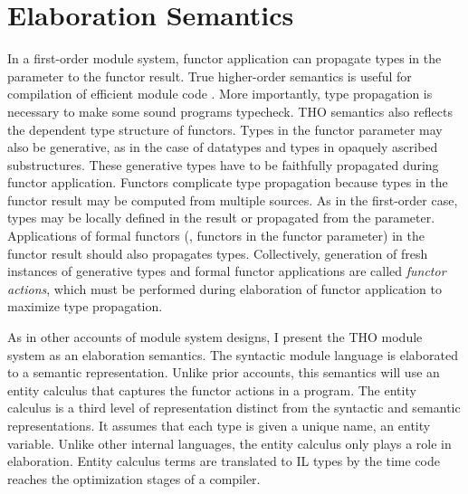   

\chapter{Elaboration Semantics}\label{ch:homods}
 
In a first-order module system, functor application can propagate types in the parameter to the functor result. True higher-order semantics is useful for compilation of efficient module code \cite{shao98}. More importantly, type propagation is necessary to make some sound programs typecheck. THO semantics also reflects the dependent type structure of functors. Types in the functor parameter may also be generative, as in the case of datatypes and types in opaquely ascribed substructures. These generative types have to be faithfully propagated during functor application. Functors complicate type propagation because types in the functor result may be computed from multiple sources. As in the first-order case, types may be locally defined in the result or propagated from the parameter. Applications of formal functors (\ie, functors in the functor parameter) in the functor result should also propagates types. Collectively, generation of fresh instances of generative types and formal functor applications are called \emph{functor actions}, which must be performed during elaboration of functor application to maximize type propagation.    
 
As in other accounts of module system designs, I present the THO module system as an elaboration semantics. The syntactic module language is elaborated to a semantic representation. Unlike prior accounts, this semantics will use an entity calculus that captures the functor actions in a program. The entity calculus is a third level of representation distinct from the syntactic and semantic representations. It assumes that each type is given a unique name, an entity variable. Unlike other internal languages, the entity calculus only plays a role in elaboration. Entity calculus terms are translated to IL types by the time code reaches the optimization stages of a compiler. 
      
